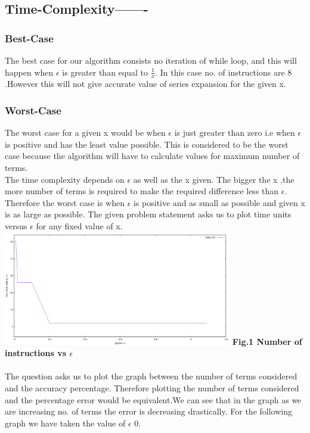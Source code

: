 \documentclass[conference]{IEEEtran}
\begin{document}
{{\subsection{\textbf{Time-Complexity-------}}
\subsubsection{\textbf{Best-Case}}
The best case for our algorithm consists no iteration of while loop, and this will happen when $\epsilon$ is greater than equal to $\frac{1}{x}$.
In this case no. of instructions are 8 .However this will not give accurate value of series expansion for the given x.\\
\subsubsection{\textbf{Worst-Case}}
The worst case for a given  x would be when $\epsilon$ is just greater than zero i.e when $\epsilon$ is positive and has the least value possible. This is considered to be the worst case because the algorithm will have to calculate values for maximum number of terms.\\ 
The time complexity depends on $\epsilon$ as well as the x given. The bigger the x ,the more number of terms is required to make the required difference less than $\epsilon$. Therefore the worst case is when $\epsilon$ is positive and as small as possible and given x is  as large as possible. The given problem statement asks us to plot time units versus $\epsilon$ for any fixed value of x.
\includegraphics[height =  5.0cm,width = \linewidth]{graph.png}
\textbf{Fig.1 Number of instructions vs $\epsilon$}\\\\
The question asks us to plot the graph between the number of
terms considered and the accuracy percentage. Therefore plotting the number of terms considered and the percentage error would be equivalent.We can see that in the graph as we are increasing no. of terms the error is decreasing drastically. For the following graph we have taken the value of $\epsilon$ 0.
}}
\end{document}
